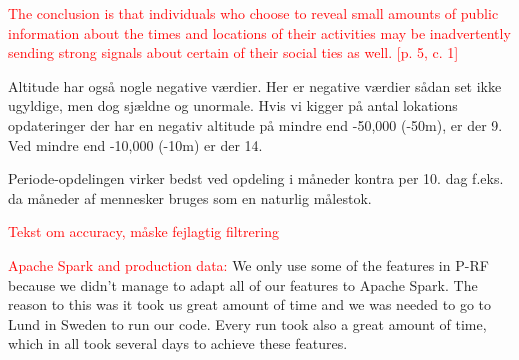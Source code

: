 \textcolor{red}{The conclusion is that individuals who choose to reveal small amounts of public information about the times and locations of their activities may be inadvertently sending strong signals about certain of their social ties as well. [p. 5, c. 1]}


Altitude har også nogle negative værdier. Her er negative værdier sådan set ikke ugyldige, men dog sjældne og unormale. Hvis vi kigger på antal lokations opdateringer der har en negativ altitude på mindre end -50,000 (-50m), er der 9. Ved mindre end -10,000 (-10m) er der 14.

Periode-opdelingen virker bedst ved opdeling i måneder kontra per 10. dag f.eks. da måneder af mennesker bruges som en naturlig målestok.

\textcolor{red}{Tekst om accuracy, måske fejlagtig filtrering}

\textcolor{red}{Apache Spark and production data:} We only use some of the features in P-RF because we didn't manage to adapt all of our features to Apache Spark. The reason to this was it took us great amount of time and we was needed to go to Lund in Sweden to run our code. Every run took also a great amount of time, which in all took several days to achieve these features.